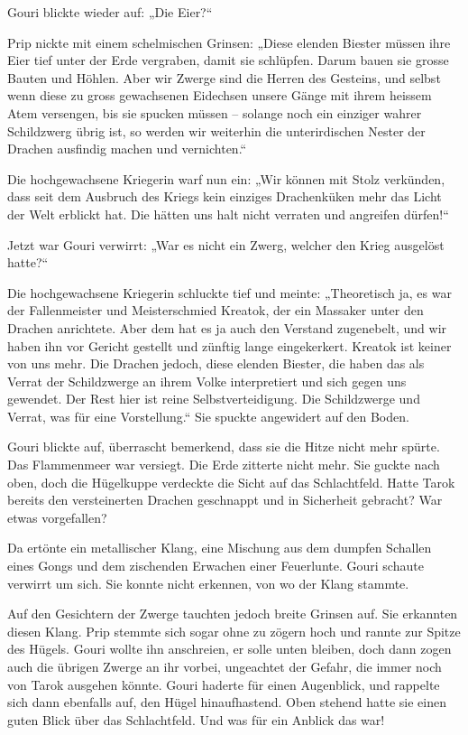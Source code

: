 Gouri blickte wieder auf: „Die Eier?“

Prip nickte mit einem schelmischen Grinsen: „Diese elenden Biester müssen ihre Eier tief unter der Erde vergraben, damit sie schlüpfen. Darum bauen sie grosse Bauten und Höhlen. Aber wir Zwerge sind die Herren des Gesteins, und selbst wenn diese zu gross gewachsenen Eidechsen unsere Gänge mit ihrem heissem Atem versengen, bis sie spucken müssen – solange noch ein einziger wahrer Schildzwerg übrig ist, so werden wir weiterhin die unterirdischen Nester der Drachen ausfindig machen und vernichten.“

Die hochgewachsene Kriegerin warf nun ein: „Wir können mit Stolz verkünden, dass seit dem Ausbruch des Kriegs kein einziges Drachenküken mehr das Licht der Welt erblickt hat. Die hätten uns halt nicht verraten und angreifen dürfen!“

Jetzt war Gouri verwirrt: „War es nicht ein Zwerg, welcher den Krieg ausgelöst hatte?“

Die hochgewachsene Kriegerin schluckte tief und meinte: „Theoretisch ja, es war der Fallenmeister und Meisterschmied Kreatok, der ein Massaker unter den Drachen anrichtete. Aber dem hat es ja auch den Verstand zugenebelt, und wir haben ihn vor Gericht gestellt und zünftig lange eingekerkert. Kreatok ist keiner von uns mehr. Die Drachen jedoch, diese elenden Biester, die haben das als Verrat der Schildzwerge an ihrem Volke interpretiert und sich gegen uns gewendet. Der Rest hier ist reine Selbstverteidigung. Die Schildzwerge und Verrat, was für eine Vorstellung.“ Sie spuckte angewidert auf den Boden.

Gouri blickte auf, überrascht bemerkend, dass sie die Hitze nicht mehr spürte. Das Flammenmeer war versiegt. Die Erde zitterte nicht mehr. Sie guckte nach oben, doch die Hügelkuppe verdeckte die Sicht auf das Schlachtfeld. Hatte Tarok bereits den versteinerten Drachen geschnappt und in Sicherheit gebracht? War etwas vorgefallen?

Da ertönte ein metallischer Klang, eine Mischung aus dem dumpfen Schallen eines Gongs und dem zischenden Erwachen einer Feuerlunte. Gouri schaute verwirrt um sich. Sie konnte nicht erkennen, von wo der Klang stammte.

Auf den Gesichtern der Zwerge tauchten jedoch breite Grinsen auf. Sie erkannten diesen Klang. Prip stemmte sich sogar ohne zu zögern hoch und rannte zur Spitze des Hügels. Gouri wollte ihn anschreien, er solle unten bleiben, doch dann zogen auch die übrigen Zwerge an ihr vorbei, ungeachtet der Gefahr, die immer noch von Tarok ausgehen könnte. Gouri haderte für einen Augenblick, und rappelte sich dann ebenfalls auf, den Hügel hinaufhastend. Oben stehend hatte sie einen guten Blick über das Schlachtfeld. Und was für ein Anblick das war!

